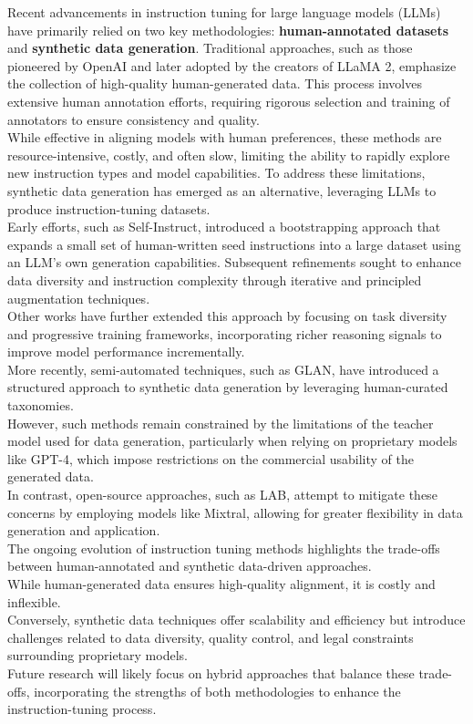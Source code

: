 \documentclass[12pt]{article}
\begin{document}
Recent advancements in instruction tuning for large language models (LLMs) have primarily relied on two key methodologies: \textbf{human-annotated datasets} and \textbf{synthetic data generation}. Traditional approaches, such as those pioneered by OpenAI and later adopted by the creators of LLaMA 2, emphasize the collection of high-quality human-generated data. This process involves extensive human annotation efforts, requiring rigorous selection and training of annotators to ensure consistency and quality.\vspace{14pt}\\
While effective in aligning models with human preferences, these methods are resource-intensive, costly, and often slow, limiting the ability to rapidly explore new instruction types and model capabilities.
To address these limitations, synthetic data generation has emerged as an alternative, leveraging LLMs to produce instruction-tuning datasets.\vspace{14pt}\\
Early efforts, such as Self-Instruct, introduced a bootstrapping approach that expands a small set of human-written seed instructions into a large dataset using an LLM’s own generation capabilities. Subsequent refinements sought to enhance data diversity and instruction complexity through iterative and principled augmentation techniques.\\
Other works have further extended this approach by focusing on task diversity and progressive training frameworks, incorporating richer reasoning signals to improve model performance incrementally.\vspace{14pt}\\
More recently, semi-automated techniques, such as GLAN, have introduced a structured approach to synthetic data generation by leveraging human-curated taxonomies.\\
However, such methods remain constrained by the limitations of the teacher model used for data generation, particularly when relying on proprietary models like GPT-4, which impose restrictions on the commercial usability of the generated data.\vspace{14pt}\\
In contrast, open-source approaches, such as LAB, attempt to mitigate these concerns by employing models like Mixtral, allowing for greater flexibility in data generation and application.\vspace{14pt}\\
The ongoing evolution of instruction tuning methods highlights the trade-offs between human-annotated and synthetic data-driven approaches.\\
While human-generated data ensures high-quality alignment, it is costly and inflexible.\\
Conversely, synthetic data techniques offer scalability and efficiency but introduce challenges related to data diversity, quality control, and legal constraints surrounding proprietary models.\\
Future research will likely focus on hybrid approaches that balance these trade-offs, incorporating the strengths of both methodologies to enhance the instruction-tuning process.
\end{document}
